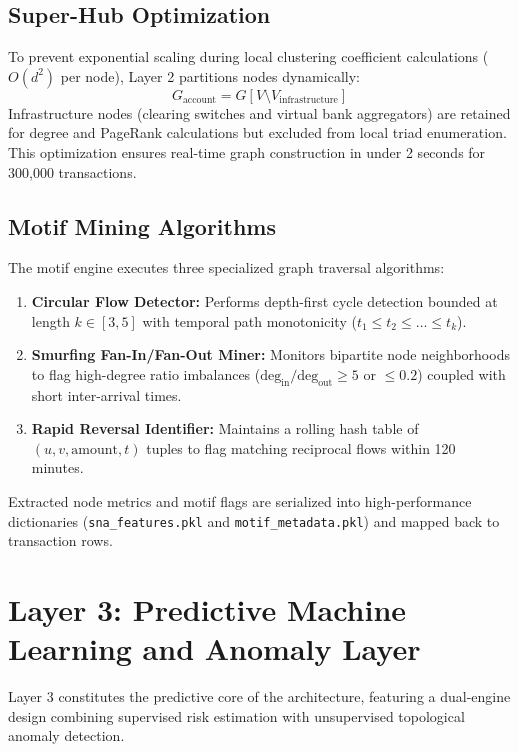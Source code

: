 \subsection{Super-Hub Optimization}
To prevent exponential scaling during local clustering coefficient calculations ($O(d^2)$ per node), Layer 2 partitions nodes dynamically:
\begin{equation}
    G_{\text{account}} = G[V \setminus V_{\text{infrastructure}}]
\end{equation}
Infrastructure nodes (clearing switches and virtual bank aggregators) are retained for degree and PageRank calculations but excluded from local triad enumeration. This optimization ensures real-time graph construction in under 2 seconds for 300,000 transactions.

\subsection{Motif Mining Algorithms}
The motif engine executes three specialized graph traversal algorithms:
\begin{enumerate}
    \item \textbf{Circular Flow Detector:} Performs depth-first cycle detection bounded at length $k \in [3, 5]$ with temporal path monotonicity ($t_1 \le t_2 \le \dots \le t_k$).
    \item \textbf{Smurfing Fan-In/Fan-Out Miner:} Monitors bipartite node neighborhoods to flag high-degree ratio imbalances ($\text{deg}_{\text{in}} / \text{deg}_{\text{out}} \ge 5$ or $\le 0.2$) coupled with short inter-arrival times.
    \item \textbf{Rapid Reversal Identifier:} Maintains a rolling hash table of $(u, v, \text{amount}, t)$ tuples to flag matching reciprocal flows within 120 minutes.
\end{enumerate}
Extracted node metrics and motif flags are serialized into high-performance dictionaries (\texttt{sna\_features.pkl} and \texttt{motif\_metadata.pkl}) and mapped back to transaction rows.

\section{Layer 3: Predictive Machine Learning and Anomaly Layer}
Layer 3 constitutes the predictive core of the architecture, featuring a dual-engine design combining supervised risk estimation with unsupervised topological anomaly detection.


